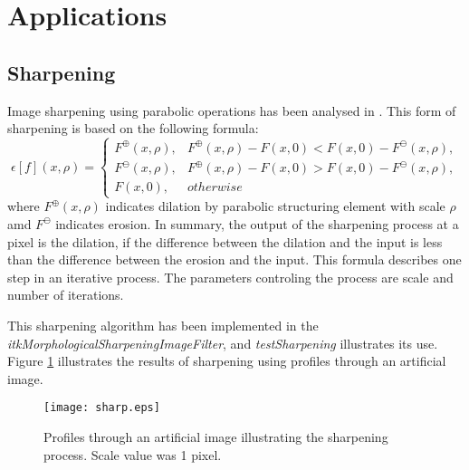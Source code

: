 \documentclass{InsightArticle}
\begin{document}
\section{Applications}
\subsection{Sharpening}
Image sharpening using parabolic operations has been analysed in
\cite{Schavemaker2000}. This form of sharpening is based on the following formula:
\begin{equation}
\epsilon[f](x, \rho) =
\begin{cases}
F^\oplus(x,\rho), &F^\oplus(x,\rho) - F(x,0) < F(x,0) - F^\ominus(x,\rho),\\
F^\ominus(x,\rho), &F^\oplus(x,\rho) - F(x,0) > F(x,0) - F^\ominus(x,\rho),\\
F(x,0), &otherwise
\end{cases}
\end{equation}
where $F^\oplus(x,\rho)$ indicates dilation by parabolic structuring
element with scale $\rho$ amd $F^\ominus$ indicates erosion. In
summary, the output of the sharpening process at a pixel is the
dilation, if the difference between the dilation and the input is less
than the difference between the erosion and the input. This formula
describes one step in an iterative process. The parameters controling
the process are scale and number of iterations.

This sharpening algorithm has been implemented in the {\em
  itkMorphologicalSharpeningImageFilter}, and {\em testSharpening}
illustrates its use. Figure \ref{fig:sharpprofs} illustrates the
results of sharpening using profiles through an artificial image.

\begin{figure}[htbp]
\centering
\texttt{[image: sharp.eps]}
\caption{Profiles through an artificial image illustrating the sharpening process. Scale value was 1 pixel.\label{fig:sharpprofs}}
\end{figure}
\end{document}
